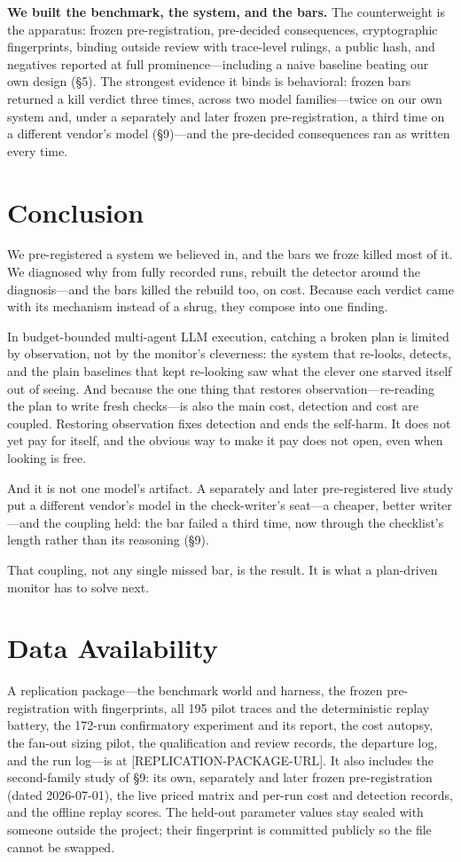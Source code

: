 \documentclass[acmsmall,screen]{acmart}
\begin{document}
\textbf{We built the benchmark, the system, and the bars.} The counterweight is
the apparatus: frozen pre-registration, pre-decided consequences, cryptographic
fingerprints, binding outside review with trace-level rulings, a public hash,
and negatives reported at full prominence---including a naive baseline beating
our own design (\S5). The strongest evidence it binds is behavioral: frozen bars
returned a kill verdict three times, across two model families---twice on our own
system and, under a separately and later frozen pre-registration, a third time on
a different vendor's model (\S9)---and the pre-decided consequences ran as written
every time.

\section{Conclusion}
We pre-registered a system we believed in, and the bars we froze killed most of
it. We diagnosed why from fully recorded runs, rebuilt the detector around the
diagnosis---and the bars killed the rebuild too, on cost. Because each verdict
came with its mechanism instead of a shrug, they compose into one finding.

In budget-bounded multi-agent LLM execution, catching a broken plan is limited
by observation, not by the monitor's cleverness: the system that re-looks,
detects, and the plain baselines that kept re-looking saw what the clever one
starved itself out of seeing. And because the one thing that restores
observation---re-reading the plan to write fresh checks---is also the main cost,
detection and cost are coupled. Restoring observation fixes detection and ends
the self-harm. It does not yet pay for itself, and the obvious way to make it
pay does not open, even when looking is free.

And it is not one model's artifact. A separately and later pre-registered live
study put a different vendor's model in the check-writer's seat---a cheaper,
better writer---and the coupling held: the bar failed a third time, now through
the checklist's length rather than its reasoning (\S9).

That coupling, not any single missed bar, is the result. It is what a
plan-driven monitor has to solve next.

\section*{Data Availability}
A replication package---the benchmark world and harness, the frozen
pre-registration with fingerprints, all 195 pilot traces and the deterministic
replay battery, the 172-run confirmatory experiment and its report, the cost
autopsy, the fan-out sizing pilot, the qualification and review records, the
departure log, and the run log---is at [REPLICATION-PACKAGE-URL]. It also includes
the second-family study of \S9: its own, separately and later frozen
pre-registration (dated 2026-07-01), the live priced matrix and per-run cost and
detection records, and the offline replay scores. The held-out parameter values
stay sealed with someone outside the project; their fingerprint is committed
publicly so the file cannot be swapped.
\end{document}
